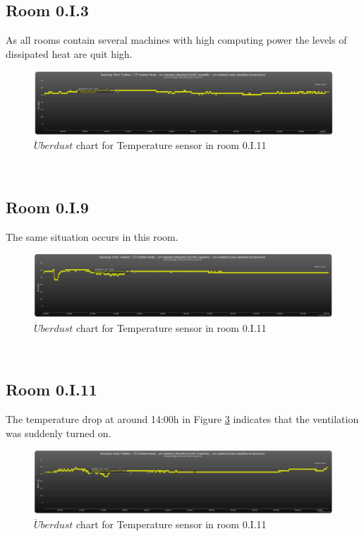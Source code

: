 \documentclass[12pt,a4paper,draft]{report}
\begin{document}
\subsection{Room 0.I.3}
%
As all rooms contain several machines with high computing power the levels of dissipated heat are quit high.
\begin{figure}[H]
\centering
	\includegraphics*[scale=0.3]{temp_3}
	\caption{$\ddot{U}berdust$ chart for Temperature sensor in room 0.I.11}
	\label{chart_temp_3}
\end{figure}
\ \\
%
\subsection{Room 0.I.9}
%
The same situation occurs in this room.
\begin{figure}[H]
\centering
	\includegraphics*[scale=0.3]{temp_9}
	\caption{$\ddot{U}berdust$ chart for Temperature sensor in room 0.I.11}
	\label{chart_temp_9}
\end{figure}
\ \\
%
\subsection{Room 0.I.11}
%
The temperature drop at around 14:00h in Figure \ref{chart_temp_11} indicates that the ventilation was suddenly turned on.
\begin{figure}[H]
\centering
	\includegraphics*[scale=0.3]{temp_11}
	\caption{$\ddot{U}berdust$ chart for Temperature sensor in room 0.I.11}
	\label{chart_temp_11}
\end{figure}
\ \\
%
\end{document}
